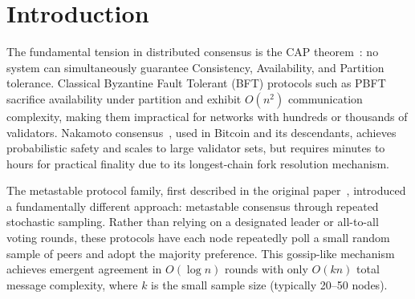 

\section{Introduction}

\label{sec:introduction}

The fundamental tension in distributed consensus is the CAP theorem~\cite{brewer2000cap}:
no system can simultaneously guarantee Consistency, Availability, and Partition tolerance.
Classical Byzantine Fault Tolerant (BFT) protocols such as PBFT~\cite{castro1999practical}
sacrifice availability under partition and exhibit $O(n^2)$ communication complexity, making
them impractical for networks with hundreds or thousands of validators.
Nakamoto consensus~\cite{nakamoto2008bitcoin}, used in Bitcoin and its descendants, achieves
probabilistic safety and scales to large validator sets, but requires minutes to hours for
practical finality due to its longest-chain fork resolution mechanism.

The metastable protocol family, first described in the original
paper~\cite{rocket2019wave}, introduced a fundamentally different approach: metastable
consensus through repeated stochastic sampling. Rather than relying on a designated leader
or all-to-all voting rounds, these protocols have each node repeatedly poll a small random
sample of peers and adopt the majority preference. This gossip-like mechanism achieves
emergent agreement in $O(\log n)$ rounds with only $O(kn)$ total message complexity, where
$k$ is the small sample size (typically 20--50 nodes).

